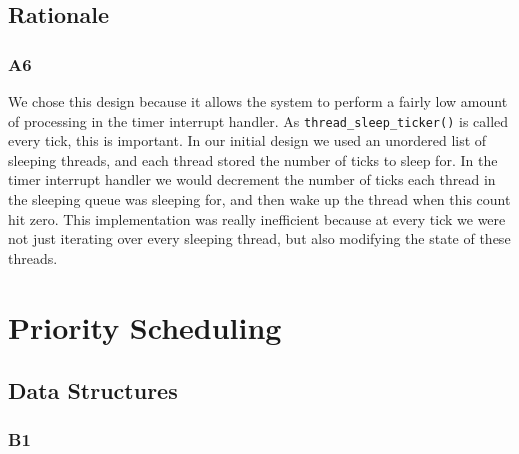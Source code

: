 \documentclass[a4wide, 11pt]{article}
\newcommand{\tx}{\texttt}
\begin{document}
\subsection{Rationale}
\subsubsection{A6}
We chose this design because it allows the system to perform a fairly low amount of processing in the timer interrupt handler. As \tx{thread\_sleep\_ticker()} is called every tick, this is important. In our initial design we used an unordered list of sleeping threads, and each thread stored the number of ticks to sleep for. In the timer interrupt handler we would decrement the number of ticks each thread in the sleeping queue was
sleeping for, and then wake up the thread when this count hit zero. This implementation was really inefficient because at every tick we were not just iterating over every sleeping thread, but also modifying the state of these threads.
\newpage


\section{Priority Scheduling}
\subsection{Data Structures}
\subsubsection{B1}
\end{document}
